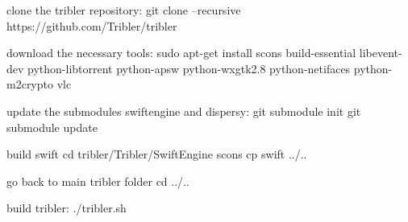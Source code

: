 clone the tribler repository:
git clone --recursive https://github.com/Tribler/tribler

download the necessary tools:
sudo apt-get install scons build-essential libevent-dev python-libtorrent python-apsw python-wxgtk2.8 python-netifaces python-m2crypto vlc

update the submodules swiftengine and dispersy:
git submodule init
git submodule update

build swift
cd  tribler/Tribler/SwiftEngine
scons 
cp swift ../..

go back to main tribler folder
cd ../..

build tribler:
./tribler.sh
